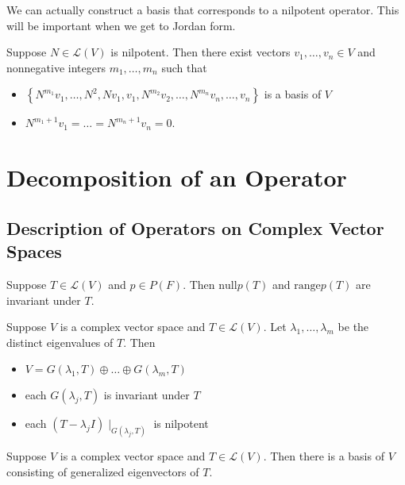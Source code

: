\documentclass{memoir}
\begin{document}
We can actually construct a basis that corresponds to a nilpotent operator. This will be important when we get to Jordan form.

\begin{prop}
	Suppose \(N \in \mathcal{L}(V)\) is nilpotent. Then there exist vectors \(v_1,\ldots,v_n \in V\) and nonnegative integers \(m_1,\ldots,m_n\) such that
	\begin{itemize}
		\item \(\left\{  N^{m_1}v_1,\ldots,N^2,Nv_1,v_1,N^{m_2}v_2,\ldots,N^{m_n}v_n,\ldots,v_n \right\}\) is a basis of \(V\) 
		\item \(N^{m_1+1}v_1 = \ldots = N^{m_n+1}v_n = 0\).
	\end{itemize}
\end{prop}

\section{Decomposition of an Operator}
\label{sec:decomposition_of_an_operator}

\subsection{Description of Operators on Complex Vector Spaces}
\label{subsec:description_of_operators_on_complex_vector_spaces}
\begin{prop}
	Suppose \(T \in \mathcal{L}(V)\) and \(p \in P(F)\). Then \( \textrm{null}p(T)\) and \( \textrm{range}p(T)\) are invariant under \(T\).
\end{prop}

\begin{thm}
	Suppose \(V\) is a complex vector space and \(T \in \mathcal{L}(V)\). Let \(\lambda_1,\ldots,\lambda_m\) be the distinct eigenvalues of \(T\). Then
	\begin{itemize}
		\item \(V = G(\lambda_1,T) \oplus \ldots \oplus G(\lambda_m,T)\) 
		\item each \(G(\lambda_j,T)\) is invariant under \(T\) 
		\item each \((T-\lambda_jI)\mid_{G(\lambda_j,T)}\) is nilpotent
	\end{itemize}
\end{thm}
\begin{prop}
	Suppose \(V\) is a complex vector space and \(T \in \mathcal{L}(V)\). Then there is a basis of \(V \) consisting of generalized eigenvectors of \(T\).
\end{prop}
\end{document}
